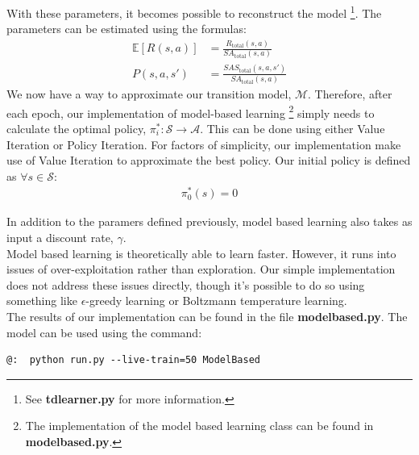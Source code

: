 \documentclass[letterpaper]{article}
\begin{document}
With these parameters, it becomes possible to reconstruct the model \footnote{See \textbf{tdlearner.py} for more information.}. The parameters can be estimated using the formulas:
\begin{align}
\mathbb{E}[R(s,a)] &= \frac{R_{\text{total}}(s,a)}{SA_{\text{total}}(s,a)}\\
P(s,a,s') &= \frac{SAS_{\text{total}}(s,a,s')}{SA_{\text{total}}(s,a)} 
\end{align}
We now have a way to approximate our transition model, $\mathcal{M}$. Therefore, after each epoch, our implementation of model-based learning \footnote{The implementation of the model based learning class can be found in \textbf{modelbased.py}.} simply needs to calculate the optimal policy, $\pi_i^*: \mathcal{S} \to \mathcal{A}$. This can be done using either Value Iteration or Policy Iteration. For factors of simplicity, our implementation make use of Value Iteration to approximate the best policy. Our initial policy is defined as $\forall s \in \mathcal{S}$:
\begin{align}
\pi^*_0(s) = 0
\end{align}

In addition to the paramers defined previously, model based learning also takes as input a discount rate, $\gamma$. \\

Model based learning is theoretically able to learn faster. However, it runs into issues of over-exploitation rather than exploration. Our simple implementation does not address these issues directly, though it's possible to do so using something like $\epsilon$-greedy learning or Boltzmann temperature learning. \\

The results of our implementation can be found in the file \textbf{modelbased.py}. The model can be used using the command:
\begin{verbatim}
@:	python run.py --live-train=50 ModelBased 
\end{verbatim}
\end{document}
